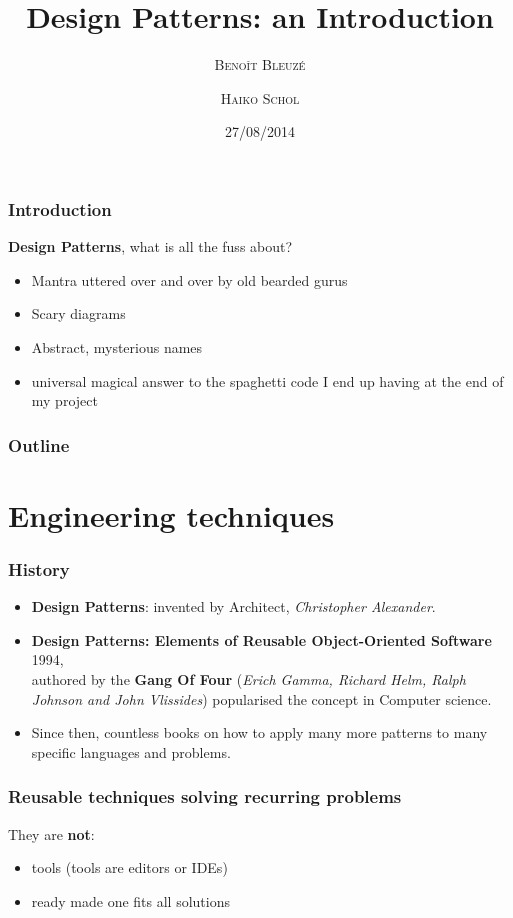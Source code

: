 \documentclass{beamer}
\title
{Design Patterns: an Introduction}
\author[B. Bleuz\'e \and H. Schol] %
{\textsc{Beno\^it Bleuz\'e} \and \textsc{Haiko Schol}}
\date[2014] %
{27/08/2014}
\begin{document}
\begin{frame}
  \titlepage
\end{frame}

\begin{frame}
\frametitle {Introduction}
  \textbf{Design Patterns}, what is all the fuss about?
\begin{itemize}
 \item Mantra uttered over and over by old bearded gurus
 \item Scary diagrams
 \item Abstract, mysterious names
 \item universal magical answer to the spaghetti code I end up having at the end of my project
\end{itemize}
\centering {}
\end{frame}

\begin{frame}
  \frametitle{Outline}
  \tableofcontents
\end{frame}

\section{Engineering techniques}
\begin{frame}
\frametitle {History}
\begin{itemize}
 \item \textbf{Design Patterns}: invented by  Architect, \emph{Christopher Alexander}.\pause
 \item \pause \textbf{Design Patterns: Elements of Reusable Object-Oriented Software} 1994, \\
authored by the \textbf{Gang Of Four} (\emph{Erich Gamma, Richard Helm, Ralph Johnson and John Vlissides}) popularised the concept in Computer science.
 \item \pause Since then, countless books on how to apply many more patterns to many specific languages and problems.
\end{itemize}




\end{frame}
\begin{frame}
 \frametitle{Reusable techniques solving recurring problems}
They are \textbf{not}:
  \begin{itemize}
   \item tools (tools are editors or IDEs)
   \item ready made one fits all solutions
  \end{itemize}
\end{frame}
\end{document}
